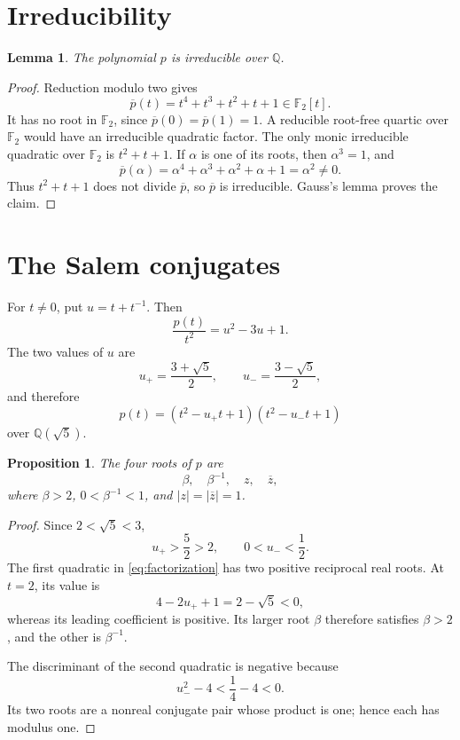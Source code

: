 \documentclass[10pt,reqno]{amsart}
\newtheorem{proposition}[theorem]{Proposition}
\newtheorem{lemma}[theorem]{Lemma}
\theoremstyle{definition}
\newcommand{\Q}{\mathbb Q}
\newcommand{\F}{\mathbb F}
\begin{document}
\section{Irreducibility}

\begin{lemma}\label{lem:irreducible}
The polynomial \(p\) is irreducible over \(\Q\).
\end{lemma}

\begin{proof}
Reduction modulo two gives
\[
 \overline p(t)=t^4+t^3+t^2+t+1\in\F_2[t].
\]
It has no root in \(\F_2\), since
\(\overline p(0)=\overline p(1)=1\).  A reducible root-free quartic over
\(\F_2\) would have an irreducible quadratic factor.  The only monic
irreducible quadratic over \(\F_2\) is \(t^2+t+1\).  If \(\alpha\) is one
of its roots, then \(\alpha^3=1\), and
\[
 \overline p(\alpha)
 =\alpha^4+\alpha^3+\alpha^2+\alpha+1
 =\alpha^2\ne0.
\]
Thus \(t^2+t+1\) does not divide \(\overline p\), so \(\overline p\) is
irreducible.  Gauss's lemma proves the claim.
\end{proof}

\section{The Salem conjugates}

For \(t\ne0\), put \(u=t+t^{-1}\).  Then
\begin{equation}\label{eq:reciprocal}
 \frac{p(t)}{t^2}=u^2-3u+1.
\end{equation}
The two values of \(u\) are
\[
 u_+=\frac{3+\sqrt5}{2},
 \qquad
 u_-=\frac{3-\sqrt5}{2},
\]
and therefore
\begin{equation}\label{eq:factorization}
 p(t)=(t^2-u_+t+1)(t^2-u_-t+1)
\end{equation}
over \(\Q(\sqrt5)\).

\begin{proposition}\label{prop:salem}
The four roots of \(p\) are
\[
 \beta,\quad \beta^{-1},\quad z,\quad\overline z,
\]
where \(\beta>2\), \(0<\beta^{-1}<1\), and
\(|z|=|\overline z|=1\).
\end{proposition}

\begin{proof}
Since \(2<\sqrt5<3\),
\[
 u_+>\frac52>2,
 \qquad 0<u_-<\frac12.
\]
The first quadratic in \eqref{eq:factorization} has two positive reciprocal
real roots.  At \(t=2\), its value is
\[
 4-2u_++1=2-\sqrt5<0,
\]
whereas its leading coefficient is positive.  Its larger root \(\beta\)
therefore satisfies \(\beta>2\), and the other is \(\beta^{-1}\).

The discriminant of the second quadratic is negative because
\[
 u_-^2-4<\frac14-4<0.
\]
Its two roots are a nonreal conjugate pair whose product is one; hence each
has modulus one.
\end{proof}
\end{document}
